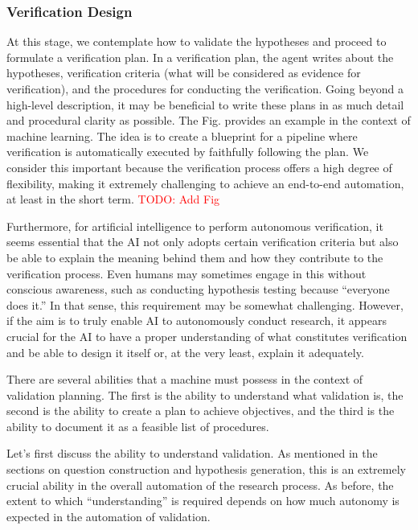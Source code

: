 \documentclass{book}
\begin{document}
\subsubsection{Verification Design} 
At this stage, we contemplate how to validate the hypotheses and proceed to formulate a verification plan. In a verification plan, the agent writes about the hypotheses, verification criteria (what will be considered as evidence for verification), and the procedures for conducting the verification. Going beyond a high-level description, it may be beneficial to write these plans in as much detail and procedural clarity as possible. The Fig. provides an example in the context of machine learning. The idea is to create a blueprint for a pipeline where verification is automatically executed by faithfully following the plan. We consider this important because the verification process offers a high degree of flexibility, making it extremely challenging to achieve an end-to-end automation, at least in the short term. \textcolor{red}{TODO: Add Fig}

Furthermore, for artificial intelligence to perform autonomous verification, it seems essential that the AI not only adopts certain verification criteria but also be able to explain the meaning behind them and how they contribute to the verification process. Even humans may sometimes engage in this without conscious awareness, such as conducting hypothesis testing because ``everyone does it.'' In that sense, this requirement may be somewhat challenging. However, if the aim is to truly enable AI to autonomously conduct research, it appears crucial for the AI to have a proper understanding of what constitutes verification and be able to design it itself or, at the very least, explain it adequately.

There are several abilities that a machine must possess in the context of validation planning. The first is the ability to understand what validation is, the second is the ability to create a plan to achieve objectives, and the third is the ability to document it as a feasible list of procedures.

Let's first discuss the ability to understand validation. As mentioned in the sections on question construction and hypothesis generation, this is an extremely crucial ability in the overall automation of the research process. As before, the extent to which ``understanding'' is required depends on how much autonomy is expected in the automation of validation.
\end{document}
